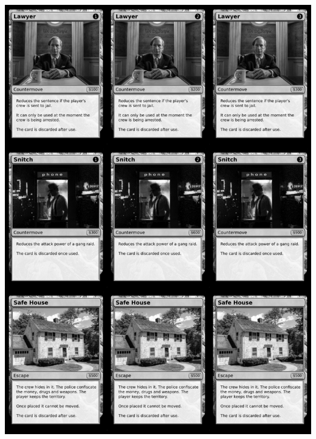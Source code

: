 \documentclass[a4paper]{article}
\begin{document}
\begin{center}
	\centering
	\includegraphics[width=190.5mm,height=266.7mm]{output/temp/page31.png}
\end{center}

\newpage
\end{document}
